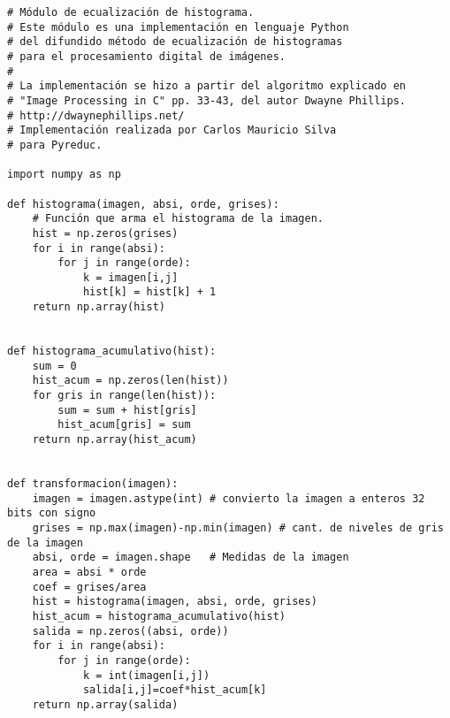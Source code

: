 \begin{lstlisting}[style=python]
# Módulo de ecualización de histograma.
# Este módulo es una implementación en lenguaje Python
# del difundido método de ecualización de histogramas
# para el procesamiento digital de imágenes.
#
# La implementación se hizo a partir del algoritmo explicado en
# "Image Processing in C" pp. 33-43, del autor Dwayne Phillips.
# http://dwaynephillips.net/
# Implementación realizada por Carlos Mauricio Silva
# para Pyreduc.

import numpy as np

def histograma(imagen, absi, orde, grises):
    # Función que arma el histograma de la imagen.
    hist = np.zeros(grises)
    for i in range(absi):
        for j in range(orde):
            k = imagen[i,j]
            hist[k] = hist[k] + 1
    return np.array(hist)


def histograma_acumulativo(hist):
    sum = 0
    hist_acum = np.zeros(len(hist))
    for gris in range(len(hist)):
        sum = sum + hist[gris]
        hist_acum[gris] = sum
    return np.array(hist_acum)


def transformacion(imagen):
    imagen = imagen.astype(int) # convierto la imagen a enteros 32 bits con signo
    grises = np.max(imagen)-np.min(imagen) # cant. de niveles de gris de la imagen
    absi, orde = imagen.shape   # Medidas de la imagen
    area = absi * orde
    coef = grises/area
    hist = histograma(imagen, absi, orde, grises)
    hist_acum = histograma_acumulativo(hist)
    salida = np.zeros((absi, orde))
    for i in range(absi):
        for j in range(orde):
            k = int(imagen[i,j])
            salida[i,j]=coef*hist_acum[k]
    return np.array(salida)
\end{lstlisting}